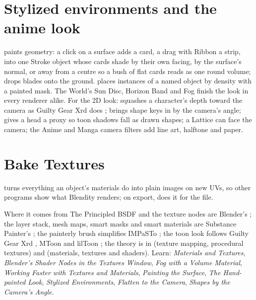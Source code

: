 \section{Stylized environments and the anime look}
 paints geometry: a click on a surface adds a card, a drag with Ribbon a strip, into one
Stroke object whose cards shade by their own facing, by the surface's normal, or away from a  centre so a
bush of flat cards reads as one round volume;  drops blades onto the ground.  places instances of a named object by density with a painted mask. The World's Sun Disc, Horizon Band and
Fog finish the look in every renderer alike. For the 2D look:  squashes a character's depth toward
the camera as Guilty Gear Xrd does \cite{Motomura2015};  brings shape keys in by the camera's
angle;  gives a head a proxy so toon shadows fall as drawn shapes; a Lattice can face the camera;
the Anime and Manga camera filters add line art, halftone and paper.

\section{Bake Textures}
 turns everything an object's materials do into plain images on new UVs, so other programs show what
Blendity renders; on export,  does it for the file.

\begin{fromnote}{Where it comes from}
The Principled BSDF and the texture nodes are Blender's \cite{Blender2026, BlenderManual2026}; the layer stack, mesh
maps, smart masks and smart materials are Substance Painter's \cite{SubstancePainterDocs2026}; the painterly brush
simplifies IMPaSTo \cite{Baxter2004Impasto}; the toon look follows Guilty Gear Xrd \cite{Motomura2015}, MToon
\cite{MToon2026} and lilToon \cite{lilToon2026}; the theory is in \cite{MarschnerShirley2021} (texture mapping,
procedural textures) and \cite{Gregory2018vol2} (materials, textures and shaders). Learn: \emph{Materials and
Textures}, \emph{Blender's Shader Nodes in the Textures Window}, \emph{Fog with a Volume Material}, \emph{Working
Faster with Textures and Materials}, \emph{Painting the Surface}, \emph{The Hand-painted Look}, \emph{Stylized
Environments}, \emph{Flatten to the Camera}, \emph{Shapes by the Camera's Angle}.
\end{fromnote}
